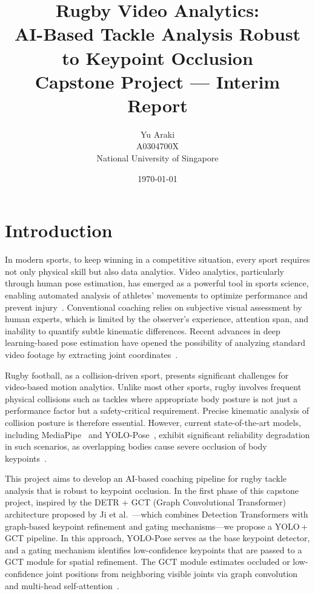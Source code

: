 \documentclass{article}
\title{
  \Large \textbf{Rugby Video Analytics: \\
  AI-Based Tackle Analysis Robust to Keypoint Occlusion} \\
  \large Capstone Project --- Interim Report
}
\author{
  Yu Araki \\
  \small A0304700X \\
  National University of Singapore
}
\date{\today}
\begin{document}
\maketitle
\tableofcontents
\newpage

\section{Introduction}

In modern sports, to keep winning in a competitive situation, every sport requires not only physical skill but also data analytics. Video analytics, 
particularly through human pose estimation, has emerged as a powerful 
tool in sports science, enabling automated analysis of athletes' 
movements to optimize performance and prevent injury~\cite{zheng2021survey}. 
Conventional coaching relies on subjective visual assessment by human 
experts, which is limited by the observer's experience, attention span, 
and inability to quantify subtle kinematic differences. Recent advances 
in deep learning-based pose estimation have opened the possibility of 
analyzing standard video footage by extracting joint 
coordinates~\cite{zheng2021survey}.

Rugby football, as a collision-driven sport, presents significant 
challenges for video-based motion analytics. Unlike most other sports, 
rugby involves frequent physical collisions such as tackles where appropriate body posture is not just a performance 
factor but a safety-critical requirement. Precise kinematic analysis 
of collision posture is therefore essential. However, current 
state-of-the-art models, including MediaPipe~\cite{lugaresi2019mediapipe} 
and YOLO-Pose~\cite{maji2022yolopose}, exhibit significant reliability 
degradation in such scenarios, as overlapping bodies cause severe 
occlusion of body keypoints~\cite{ji2025gct}.

This project aims to develop an AI-based coaching pipeline for rugby 
tackle analysis that is robust to keypoint occlusion. In the first 
phase of this capstone project, inspired by the DETR + GCT (Graph Convolutional Transformer) architecture proposed by Ji et al.~\cite{ji2025gct}---which combines Detection Transformers with 
graph-based keypoint refinement and gating mechanisms---we propose a YOLO\,+\,GCT pipeline. In this approach, YOLO-Pose serves as the base keypoint detector, and a gating mechanism identifies low-confidence keypoints that are passed to a GCT module for spatial refinement. The 
GCT module estimates occluded or low-confidence joint positions from neighboring visible joints via graph 
convolution~\cite{kipf2017gcn,dwivedi2021graphtransformer} and 
multi-head self-attention~\cite{vaswani2017attention}.
\end{document}

